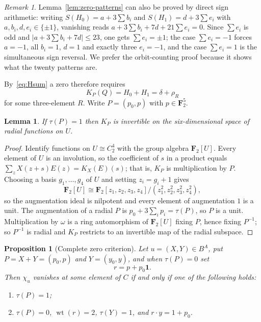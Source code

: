 \documentclass[11pt,a4paper,reqno]{amsart}
\newtheorem{proposition}[theorem]{Proposition}
\newtheorem{lemma}[theorem]{Lemma}
\theoremstyle{definition}
\theoremstyle{remark}
\newtheorem{remark}[theorem]{Remark}
\newcommand{\F}{\mathbf F}
\newcommand{\wt}{\operatorname{wt}}
\newcommand{\one}{\mathbf 1}
\begin{document}
\begin{remark}
Lemma~\ref{lem:zero-patterns} can also be proved by direct sign
arithmetic: writing $S(H_0)=a+3\sum b_i$ and $S(H_1)=d+3\sum e_i$ with
$a,b_i,d,e_i\in\{\pm1\}$, vanishing reads
$a+3\sum b_i+7d+21\sum e_i=0$.  Since $\sum e_i$ is odd and
$|a+3\sum b_i+7d|\le23$, one gets $\sum e_i=\pm1$; the case
$\sum e_i=-1$ forces $a=-1$, all $b_i=1$, $d=1$ and exactly three
$e_i=-1$, and the case $\sum e_i=1$ is the simultaneous sign reversal.
We prefer the orbit-counting proof because it shows what the twenty
patterns are.
\end{remark}

By~\eqref{eq:Hsum} a zero therefore requires
\begin{equation}\label{eq:target}
 K_P(Q)=H_0+H_1=\delta+\rho_R
\end{equation}
for some three-element $R$.  Write $P=(p_0,p)$ with $p\in\F_2^5$.

\begin{lemma}\label{lem:odd-augmentation}
If $\tau(P)=1$ then $K_P$ is invertible on the six-dimensional space of
radial functions on $U$.
\end{lemma}

\begin{proof}
Identify functions on $U\cong C_2^4$ with the group algebra $\F_2[U]$.
Every element of $U$ is an involution, so the coefficient of $s$ in a
product equals $\sum_{z}X(z+s)E(z)=K_X(E)(s)$; that is, $K_P$ is
multiplication by $P$.  Choosing a basis $g_1,\dots,g_4$ of $U$ and
setting $z_i=g_i+1$ gives
\[
 \F_2[U]\cong\F_2[z_1,z_2,z_3,z_4]/(z_1^2,z_2^2,z_3^2,z_4^2),
\]
so the augmentation ideal is nilpotent and every element of
augmentation $1$ is a unit.  The augmentation of a radial $P$ is
$p_0+3\sum_ip_i=\tau(P)$, so $P$ is a unit.  Multiplication by
$\omega$ is a ring automorphism of $\F_2[U]$ fixing $P$, hence fixing
$P^{-1}$; so $P^{-1}$ is radial and $K_P$ restricts to an invertible
map of the radial subspace.
\end{proof}

\begin{proposition}[Complete zero criterion]\label{prop:zero-criterion}
Let $u=(X,Y)\in B^A$, put $P=X+Y=(p_0,p)$ and $Y=(y_0,y)$, and when
$\tau(P)=0$ set
\[
 r=p+p_0\one .
\]
Then $\chi_u$ vanishes at some element of $C$ if and only if one of the
following holds:
\begin{enumerate}[label=\textup{(\roman*)}]
\item $\tau(P)=1$;
\item $\tau(P)=0$, $\wt(r)=2$, $\tau(Y)=1$, and $r\cdot y=1+p_0$.
\end{enumerate}
\end{proposition}
\end{document}
